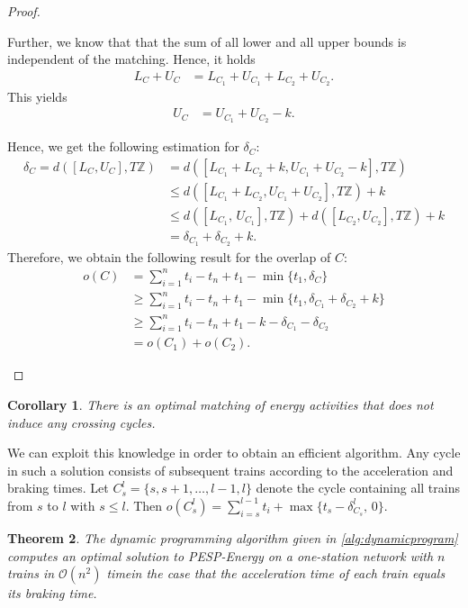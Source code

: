 \documentclass[11pt,a4paper]{article}
\newcommand{\pespenergy}{PESP-Energy\xspace}
\newcommand{\osn}{one-station network\xspace}
\newcommand{\Z}{\mathbb Z}
\newtheorem{theorem}{Theorem}[section]
\newtheorem{corollary}[theorem]{Corollary}
\theoremstyle{definition}
\theoremstyle{remark}
\begin{document}
\begin{proof}
\begin{itemize}
        Further, we know that that the sum of all lower and all upper bounds is independent of the matching. Hence, it holds
        \begin{align*}
            L_C + U_C &= L_{C_1} + U_{C_1} + L_{C_2} + U_{C_2}.
        \end{align*}
This yields
\begin{align*}
            U_C &= U_{C_1} + U_{C_2} - k.
        \end{align*}

        Hence, we get the following estimation for $\delta_C$:
        \begin{align*}
         \delta_C = d([L_C, U_C], T\Z) &=  d([L_{C_1} + L_{C_2} + k, U_{C_1} + U_{C_2} - k], T\Z) \\ 
        &\leq 
        d([L_{C_1} + L_{C_2}, U_{C_1} + U_{C_2}], T\Z) + k \\ 
        &\le  d([L_{C_1},\, U_{C_1}], T\Z) + d([L_{C_2}, U_{C_2}], T\Z) + k
        \\
        &= \delta_{C_1} + \delta_{C_2} + k.
        \end{align*}
		Therefore, we obtain the following result for the overlap of $C$:
		\begin{align*}
        o(C) &= \sum_{i=1}^{n} t_i - t_n + t_1 - \min\{t_1, \delta_C\}\\
        &\geq \sum_{i=1}^{n} t_i - t_n + t_1 - \min\{t_1, \delta_{C_1} + \delta_{C_2} + k\}\\
        &\geq \sum_{i=1}^{n} t_i - t_n + t_1  - k - \delta_{C_1} - \delta_{C_2} \\
        &= o(C_1) + o(C_2).
		\end{align*}
	\end{itemize}
\end{proof}

\begin{corollary}\label{cor:nocrossing}
    There is an optimal matching of energy activities that does not induce any crossing cycles.
\end{corollary}

We can exploit this knowledge in order to obtain an efficient algorithm. Any cycle in such a solution consists of subsequent trains according to the acceleration and braking times. Let $C_{s}^{l} = \{ s, s+1, \dots, l-1, l\}$ denote the cycle containing all trains from $s$ to $l$ with $s \leq l$. Then $o(C_{s}^{l}) = \sum_{i=s}^{l-1} t_i  + \max\{t_{s} - \delta_{C_s}^{l},\, 0 \}$. 


\begin{theorem}
	The dynamic programming algorithm given in \cref{alg:dynamicprogram} computes an optimal solution to \pespenergy on a \osn with $n$ trains in $\mathcal{O}(n^2)$ timein the case that the acceleration time of each train equals its braking time.
\end{theorem}
\end{document}
